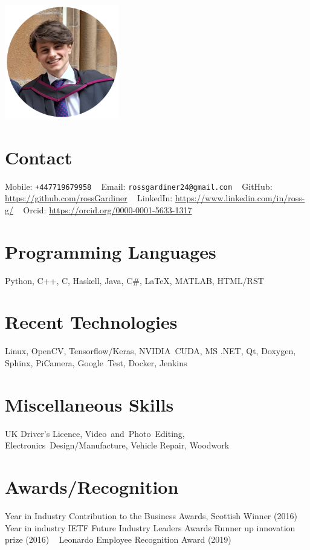 \documentclass[]{cv-style}     %
\begin{document}
\lastupdated

\begin{aside}
\includegraphics[width=5cm]{g2-cropped}
%
\section{Contact}
\vspace{0.1cm}Mobile: \texttt{+447719679958}
~
Email: \texttt{rossgardiner24@gmail.com}
~
GitHub: \url{https://github.com/rossGardiner}
~
LinkedIn: \url{https://www.linkedin.com/in/ross-g/}
~ 
Orcid: \url{https://orcid.org/0000-0001-5633-1317}
%

\section{Programming Languages}
Python, C++, C, Haskell, Java, C\#, \LaTeX, MATLAB, HTML/RST
%
\section{Recent Technologies}
Linux, OpenCV, Tensorflow/Keras, NVIDIA~CUDA, MS .NET, Qt, Doxygen, Sphinx, PiCamera, Google~Test, Docker, Jenkins
\section{Miscellaneous Skills}
UK Driver's Licence, Video~and~Photo~Editing,
Electronics~Design/Manufacture, Vehicle Repair, Woodwork 
\section{Awards/Recognition}
Year in Industry Contribution to the Business Awards, Scottish Winner (2016)
~
Year in industry IETF Future Industry Leaders Awards Runner up innovation prize (2016)
~
Leonardo Employee Recognition Award (2019)
\end{aside}
  \vspace{-0.3cm}
\end{document}
